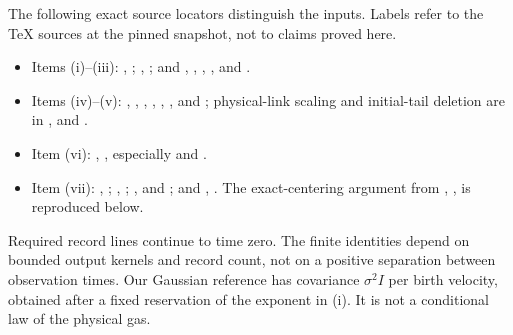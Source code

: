 The following exact source locators distinguish the inputs. Labels refer
to the TeX sources at the pinned snapshot, not to claims proved here.
\begin{itemize}[leftmargin=1.5em]\raggedright
\item Items (i)--(iii): \cite[\S3]{U},
; \cite[\S4]{U},
; and \cite[\S6]{U},
,
,
, and
.
\item Items (iv)--(v): \cite[\S4]{U},
,
,
,
,
, and
; physical-link scaling and initial-tail
deletion are in \cite[\S6]{U},
 and
.
\item Item (vi): \cite[\S2]{U}, , especially
 and
.
\item Item (vii): \cite[\S6]{U},
; \cite[\S7]{U},
; \cite[\S2]{U},
 and
; and \cite[\S5]{U},
. The exact-centering argument from
\cite[\S8]{U}, , is reproduced below.
\end{itemize}
Required record lines continue to time zero.
The finite identities depend on bounded output kernels and record count,
not on a positive separation between observation times.
Our Gaussian reference has covariance $\sigma^2I$ per birth velocity,
obtained after a fixed reservation of the exponent in (i).
It is not a conditional law of the physical gas.
